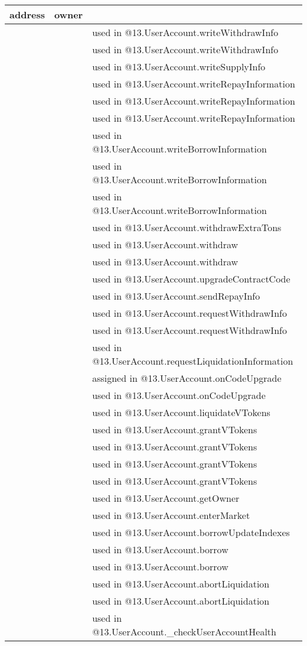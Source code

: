 \ifsoltables
\noindent\begin{tabular}{|l|l|p{5cm}|}\hline
address & owner &  \\\hline
 & & used in @13.UserAccount.writeWithdrawInfo\\\hline
 & & used in @13.UserAccount.writeWithdrawInfo\\\hline
 & & used in @13.UserAccount.writeSupplyInfo\\\hline
 & & used in @13.UserAccount.writeRepayInformation\\\hline
 & & used in @13.UserAccount.writeRepayInformation\\\hline
 & & used in @13.UserAccount.writeRepayInformation\\\hline
 & & used in @13.UserAccount.writeBorrowInformation\\\hline
 & & used in @13.UserAccount.writeBorrowInformation\\\hline
 & & used in @13.UserAccount.writeBorrowInformation\\\hline
 & & used in @13.UserAccount.withdrawExtraTons\\\hline
 & & used in @13.UserAccount.withdraw\\\hline
 & & used in @13.UserAccount.withdraw\\\hline
 & & used in @13.UserAccount.upgradeContractCode\\\hline
 & & used in @13.UserAccount.sendRepayInfo\\\hline
 & & used in @13.UserAccount.requestWithdrawInfo\\\hline
 & & used in @13.UserAccount.requestWithdrawInfo\\\hline
 & & used in @13.UserAccount.requestLiquidationInformation\\\hline
 & & assigned in @13.UserAccount.onCodeUpgrade\\\hline
 & & used in @13.UserAccount.onCodeUpgrade\\\hline
 & & used in @13.UserAccount.liquidateVTokens\\\hline
 & & used in @13.UserAccount.grantVTokens\\\hline
 & & used in @13.UserAccount.grantVTokens\\\hline
 & & used in @13.UserAccount.grantVTokens\\\hline
 & & used in @13.UserAccount.grantVTokens\\\hline
 & & used in @13.UserAccount.getOwner\\\hline
 & & used in @13.UserAccount.enterMarket\\\hline
 & & used in @13.UserAccount.borrowUpdateIndexes\\\hline
 & & used in @13.UserAccount.borrow\\\hline
 & & used in @13.UserAccount.borrow\\\hline
 & & used in @13.UserAccount.abortLiquidation\\\hline
 & & used in @13.UserAccount.abortLiquidation\\\hline
 & & used in @13.UserAccount.\_{}checkUserAccountHealth\\\hline
\end{tabular}
\fi


